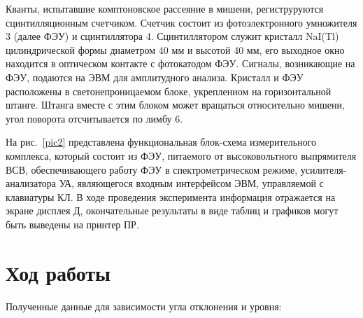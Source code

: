 \documentclass[a4paper,12pt]{article} %
\begin{document}
	Кванты, испытавшие комптоновское рассеяние в мишени, региструруются сцинтилляционным счетчиком. Счетчик состоит из фотоэлектронного умножителя 3 (далее ФЭУ) и сцинтиллятора 4. Сцинтиллятором служит кристалл NaI(Tl) цилиндрической формы диаметром 40 мм и высотой 40 мм, его выходное окно находится в оптическом контакте с фотокатодом ФЭУ. Сигналы, возникающие на ФЭУ, подаются на ЭВМ для амплитудного анализа. Кристалл и ФЭУ расположены в светонепроницаемом блоке, укрепленном на горизонтальной штанге. Штанга вместе с этим блоком может вращаться относительно мишени, угол поворота отсчитывается по лимбу 6.
	
	На рис.~\ref{pic2} представлена функциональная блок-схема измерительного комплекса, который состоит из ФЭУ, питаемого от высоковольтного выпрямителя ВСВ, обеспечивающего работу ФЭУ в спектрометрическом режиме, усилителя-анализатора УА, являющегося входным интерфейсом ЭВМ, управляемой с клавиатуры КЛ. В ходе проведения эксперимента информация отражается на экране дисплея Д, окончательные результаты в виде таблиц и графиков могут быть выведены на принтер ПР.
	
	\newpage
	\section{Ход работы}

	Полученные данные для зависимости угла отклонения и уровня:	
	
\end{document}
